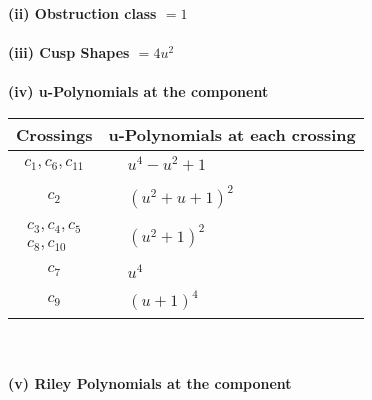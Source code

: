 \documentclass[1p]{elsarticle_modified}
\theoremstyle{definition}
\begin{document}
\flushleft \textbf{(ii) Obstruction class $= 1$}\\~\\
\flushleft \textbf{(iii) Cusp Shapes $= 4 u^2$}\\~\\
\newpage\renewcommand{\arraystretch}{1}
\flushleft \textbf{(iv) u-Polynomials at the component}\newline \\
\begin{tabular}{m{50pt}|m{274pt}}
Crossings & \hspace{64pt}u-Polynomials at each crossing \\
\hline $$\begin{aligned}c_{1},c_{6},c_{11}\end{aligned}$$&$\begin{aligned}
&u^4- u^2+1
\end{aligned}$\\
\hline $$\begin{aligned}c_{2}\end{aligned}$$&$\begin{aligned}
&(u^2+u+1)^2
\end{aligned}$\\
\hline $$\begin{aligned}c_{3},c_{4},c_{5}\\c_{8},c_{10}\end{aligned}$$&$\begin{aligned}
&(u^2+1)^2
\end{aligned}$\\
\hline $$\begin{aligned}c_{7}\end{aligned}$$&$\begin{aligned}
&u^4
\end{aligned}$\\
\hline $$\begin{aligned}c_{9}\end{aligned}$$&$\begin{aligned}
&(u+1)^4
\end{aligned}$\\
\hline
\end{tabular}\\~\\
\newpage\renewcommand{\arraystretch}{1}
\flushleft \textbf{(v) Riley Polynomials at the component}\newline \\
\end{document}

